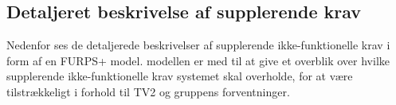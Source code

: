 


\subsection{Detaljeret beskrivelse af supplerende krav}

\noindent Nedenfor ses de detaljerede beskrivelser af supplerende ikke-funktionelle krav i form af en FURPS+ model. modellen er med til at give et overblik over hvilke supplerende ikke-funktionelle krav systemet skal overholde, for at være tilstrækkeligt i forhold til TV2 og gruppens forventninger.

